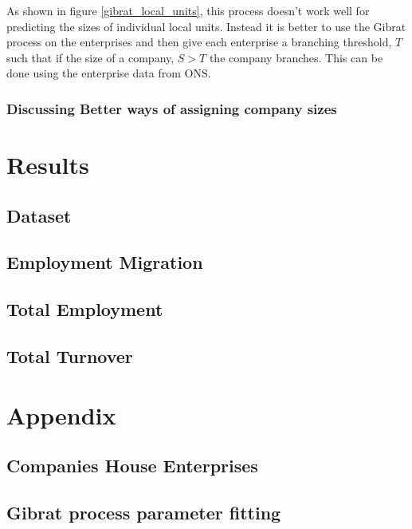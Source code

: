 \documentclass[a4paper,10pt]{article}
\begin{document}
As shown in figure \ref{gibrat_local_units}, this process doesn't work well for predicting the sizes of individual local units. Instead it is better to use the Gibrat process on the enterprises and then give each enterprise a branching threshold, $T$ such that if the size of a company, $S > T$ the company branches. This can be done using the enterprise data from ONS.

\subsubsection{Discussing Better ways of assigning company sizes}

\section{Results}
\subsection{Dataset}
\subsection{Employment Migration}
\subsection{Total Employment}
\subsection{Total Turnover}

\section{Appendix}
\subsection{Companies House Enterprises}
\subsection{Gibrat process parameter fitting}
\end{document}
